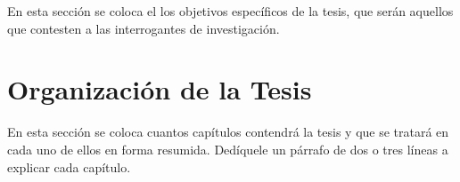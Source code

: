 En esta sección se coloca el los objetivos específicos de la tesis, que serán aquellos que contesten a las
interrogantes de investigación.

\section{Organización de la Tesis}

En esta sección se coloca cuantos capítulos contendrá la tesis y que se tratará en cada uno de
ellos en forma resumida. Dedíquele un párrafo de dos o tres líneas a explicar cada capítulo.


